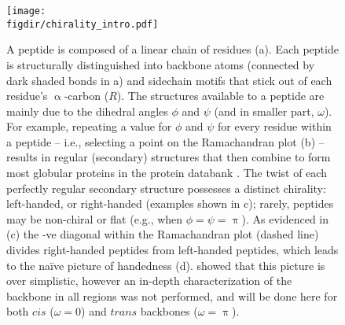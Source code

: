 \documentclass[fleqn,10pt]{wlpeerj} %
\newcommand{\figdir}{./figures}
\begin{document}
\begin{figure}[t!]
\centering
\texttt{[image: \\figdir/chirality\_intro.pdf]}
\caption{\label{fig:intro} A peptide is composed of a linear chain of residues (a). Each peptide is structurally distinguished into backbone atoms (connected by dark shaded bonds in a) and sidechain motifs that stick out of each residue's $\upalpha$-carbon ($R$). The structures available to a peptide are mainly due to the dihedral angles $\phi$ and $\psi$ (and in smaller part, $\omega$). For example, repeating a value for $\phi$ and $\psi$ for every residue within a peptide -- i.e., selecting a point on the Ramachandran plot (b) -- results in regular (secondary) structures that then combine to form most globular proteins in the protein databank \citep{Berman2000}. The twist of each perfectly regular secondary structure possesses a distinct chirality: left-handed, or right-handed (examples shown in c); rarely, peptides may be non-chiral or flat (e.g., when $\phi=\psi=\uppi$). As evidenced in (c) the -ve diagonal within the Ramachandran plot (dashed line) divides right-handed peptides from left-handed peptides, which leads to the na{\"i}ve picture of handedness (d). \cite{Zacharias2013} showed that this picture is over simplistic, however an in-depth characterization of the backbone in all regions was not performed, and will be done here for both $cis$ ($\omega=0$) and $trans$ backbones ($\omega=\uppi$).}
\end{figure}
\end{document}

